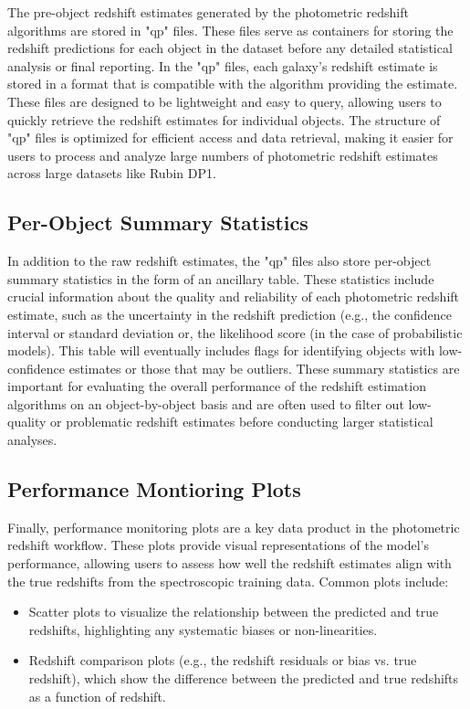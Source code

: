 The pre-object redshift estimates generated by the photometric redshift algorithms are stored in "qp" files.  These files serve as containers for storing the redshift predictions for each object in the dataset before any detailed statistical analysis or final reporting. In the "qp" files, each galaxy’s redshift estimate is stored in a format that is compatible with the algorithm providing the estimate.  These files are designed to be lightweight and easy to query, allowing users to quickly retrieve the redshift estimates for individual objects. The structure of "qp" files is optimized for efficient access and data retrieval, making it easier for users to process and analyze large numbers of photometric redshift estimates across large datasets like Rubin DP1.


\subsection{Per-Object Summary Statistics}
\label{sec: products:summary_statistics}

In addition to the raw redshift estimates, the "qp" files also store per-object summary statistics in the form of an ancillary table. These statistics include crucial information about the quality and reliability of each photometric redshift estimate, such as the uncertainty in the redshift prediction (e.g., the confidence interval or standard deviation or, the likelihood score (in the case of probabilistic models).   This table will eventually includes flags for identifying objects with low-confidence estimates or those that may be outliers. These summary statistics are important for evaluating the overall performance of the redshift estimation algorithms on an object-by-object basis and are often used to filter out low-quality or problematic redshift estimates before conducting larger statistical analyses.

\subsection{Performance Montioring Plots}
\label{sec: products:peformance_plots}

Finally, performance monitoring plots are a key data product in the photometric redshift workflow. These plots provide visual representations of the model's performance, allowing users to assess how well the redshift estimates align with the true redshifts from the spectroscopic training data. Common plots include:

\begin{itemize}
\item{Scatter plots to visualize the relationship between the predicted and true redshifts, highlighting any systematic biases or non-linearities.}
\item{Redshift comparison plots (e.g., the redshift residuals or bias vs. true redshift), which show the difference between the predicted and true redshifts as a function of redshift.}
\end{itemize}



